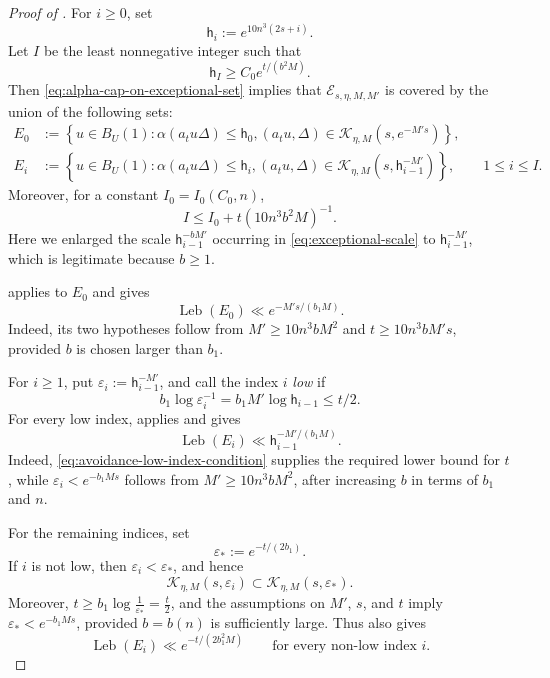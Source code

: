 \documentclass[reqno,11pt]{amsart}
\numberwithin{equation}{section}
\theoremstyle{definition}
\theoremstyle{remark}
\begin{document}
\begin{proof}[Proof of ]
For $i\ge0$, set
\begin{equation}\label{eq:avoidance-height-levels}
\mathsf{h}_i:=e^{10n^3(2s+i)}.
\end{equation}
Let $I$ be the least nonnegative integer such that
$$
\mathsf{h}_I\ge C_0e^{t/(b^2M)}.
$$
Then \eqref{eq:alpha-cap-on-exceptional-set} implies that
$\mathcal E_{s,\eta,M,M'}$ is covered by the union of the following sets:
\begin{align*}
E_0
&:=
\left\{u\in B_{U}(1):
\alpha(a_tu\Delta)\le \mathsf{h}_0,
(a_tu,\Delta)
\in\mathcal K_{\eta,M}(s,e^{-M's})
\right\},\\
E_i
&:=
\left\{u\in B_{U}(1):
\alpha(a_tu\Delta)\le \mathsf{h}_i,
(a_tu,\Delta)
\in\mathcal K_{\eta,M}(s,\mathsf{h}_{i-1}^{-M'})
\right\},
\qquad 1\le i\le I.
\end{align*}
Moreover, for a constant $I_0=I_0(C_0,n)$,
\begin{equation}\label{eq:avoidance-number-of-levels}
I\le I_0+{t}({10n^3b^2M})^{-1}.
\end{equation}
Here we enlarged the scale
$\mathsf{h}_{i-1}^{-bM'}$ occurring in
\eqref{eq:exceptional-scale} to $\mathsf{h}_{i-1}^{-M'}$, which is legitimate
because $b\ge1$.

 applies to $E_0$ and gives
\begin{equation}\label{eq:E0-measure}
\operatorname{Leb}(E_0)
\ll e^{-M's/(b_1M)}.
\end{equation}
Indeed, its two hypotheses follow from $M'\ge 10n^3bM^2$ and
$t\ge 10n^3bM's$, provided $b$ is chosen larger than $b_1$.

For $i\ge1$, put $\varepsilon_i:=\mathsf{h}_{i-1}^{-M'}$, and call the
index $i$ \emph{low} if
\begin{equation}\label{eq:avoidance-low-index-condition}
b_1\log{\varepsilon_i^{-1}}
=b_1M'\log \mathsf{h}_{i-1}
\le {t}/{2}.
\end{equation}
For every low index,  applies and gives
\begin{equation}\label{eq:low-level-measure}
\operatorname{Leb}(E_i)
\ll \mathsf{h}_{i-1}^{-M'/(b_1M)}.
\end{equation}
Indeed, \eqref{eq:avoidance-low-index-condition} supplies the required lower
bound for $t$, while
$\varepsilon_i<e^{-b_1Ms}$ follows from
$M'\ge 10n^3bM^2$, after increasing $b$ in terms of $b_1$ and $n$.

For the remaining indices, set
\begin{equation}\label{eq:avoidance-tail-scale}
\varepsilon_*:=e^{-t/(2b_1)}.
\end{equation}
If $i$ is not low, then $\varepsilon_i<\varepsilon_*$, and hence
$$
\mathcal K_{\eta,M}(s,\varepsilon_i)
\subset
\mathcal K_{\eta,M}(s,\varepsilon_*).
$$
Moreover, $ t\ge b_1\log\frac1{\varepsilon_*}=\frac{t}{2}$,
and the assumptions on $M'$, $s$, and $t$ imply
$\varepsilon_*<e^{-b_1Ms}$, provided $b=b(n)$ is sufficiently large.
Thus  also gives
\begin{equation}\label{eq:high-level-measure}
\operatorname{Leb}(E_i)
\ll e^{-t/(2b_1^2M)}
\qquad\text{for every non-low index }i.
\end{equation}


\end{proof}
\end{document}
